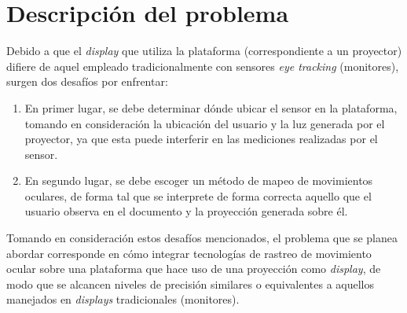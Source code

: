 
\section{Descripci\'on del problema}
\label{intro:problema}


Debido a que el \textit{display} que utiliza la plataforma (correspondiente a un proyector) difiere de aquel empleado tradicionalmente con sensores \textit{eye tracking} (monitores), surgen dos desafíos por enfrentar:
\begin{enumerate}
    \item En primer lugar, se debe determinar dónde ubicar el sensor en la plataforma, tomando en consideración la ubicación del usuario y la luz generada por el proyector, ya que esta puede interferir en las mediciones realizadas por el sensor.
    \item En segundo lugar, se debe escoger un método de mapeo de movimientos oculares, de forma tal que se interprete de forma correcta aquello que el usuario observa en el documento y la proyección generada sobre él.
\end{enumerate}

Tomando en consideración estos desafíos mencionados, el problema que se planea abordar corresponde en cómo integrar tecnologías de rastreo de movimiento ocular sobre una plataforma que hace uso de una proyección como \textit{display}, de modo que se alcancen niveles de precisión similares o equivalentes a aquellos manejados en \textit{displays} tradicionales (monitores).

